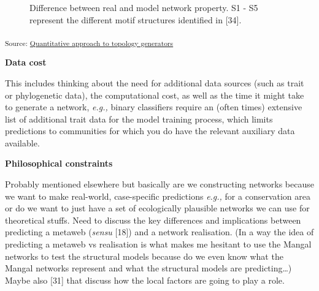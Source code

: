 \documentclass[
]{article}
\begin{document}
\begin{tcolorbox}
\begin{figure}[H]

\caption{\label{fig-topology}Difference between real and model network
property. S1 - S5 represent the different motif structures identified in
{[}34{]}.}

\end{figure}%

\textsubscript{Source:
\href{https://BecksLab.github.io/ms_t_is_for_topology/notebooks/model_quantitative-preview.html\#cell-fig-topology}{Quantitative
approach to topology generators}}

\textbf{Data cost}

This includes thinking about the need for additional data sources (such
as trait or phylogenetic data), the computational cost, as well as the
time it might take to generate a network, \emph{e.g.,} binary
classifiers require an (often times) extensive list of additional trait
data for the model training process, which limits predictions to
communities for which you do have the relevant auxiliary data available.

\textbf{Philosophical constraints}

Probably mentioned elsewhere but basically are we constructing networks
because we want to make real-world, case-specific predictions
\emph{e.g.,} for a conservation area or do we want to just have a set of
ecologically plausible networks we can use for theoretical stuffs. Need
to discuss the key differences and implications between predicting a
metaweb (\emph{sensu} {[}18{]}) and a network realisation. (In a way the
idea of predicting a metaweb vs realisation is what makes me hesitant to
use the Mangal networks to test the structural models because do we even
know what the Mangal networks represent and what the structural models
are predicting\ldots) Maybe also {[}31{]} that discuss how the local
factors are going to play a role.


\end{tcolorbox}
\end{document}
